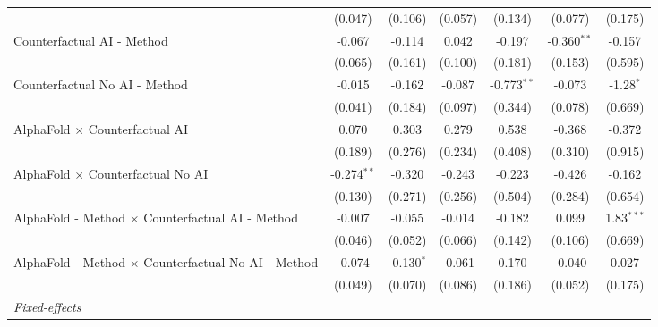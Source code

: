 \begin{tabular}{lcccccc}
                                                              & (0.047)       & (0.106)      & (0.057)       & (0.134)       & (0.077)       & (0.175)\\   
   Counterfactual AI - Method                                 & -0.067        & -0.114       & 0.042         & -0.197        & -0.360$^{**}$ & -0.157\\   
                                                              & (0.065)       & (0.161)      & (0.100)       & (0.181)       & (0.153)       & (0.595)\\   
   Counterfactual No AI - Method                              & -0.015        & -0.162       & -0.087        & -0.773$^{**}$ & -0.073        & -1.28$^{*}$\\   
                                                              & (0.041)       & (0.184)      & (0.097)       & (0.344)       & (0.078)       & (0.669)\\   
   AlphaFold $\times$ Counterfactual AI                       & 0.070         & 0.303        & 0.279         & 0.538         & -0.368        & -0.372\\   
                                                              & (0.189)       & (0.276)      & (0.234)       & (0.408)       & (0.310)       & (0.915)\\   
   AlphaFold $\times$ Counterfactual No AI                    & -0.274$^{**}$ & -0.320       & -0.243        & -0.223        & -0.426        & -0.162\\   
                                                              & (0.130)       & (0.271)      & (0.256)       & (0.504)       & (0.284)       & (0.654)\\   
   AlphaFold - Method $\times$ Counterfactual AI - Method     & -0.007        & -0.055       & -0.014        & -0.182        & 0.099         & 1.83$^{***}$\\   
                                                              & (0.046)       & (0.052)      & (0.066)       & (0.142)       & (0.106)       & (0.669)\\   
   AlphaFold - Method $\times$ Counterfactual No AI - Method  & -0.074        & -0.130$^{*}$ & -0.061        & 0.170         & -0.040        & 0.027\\   
                                                              & (0.049)       & (0.070)      & (0.086)       & (0.186)       & (0.052)       & (0.175)\\   
   \midrule
   \emph{Fixed-effects}\\

\end{tabular}
